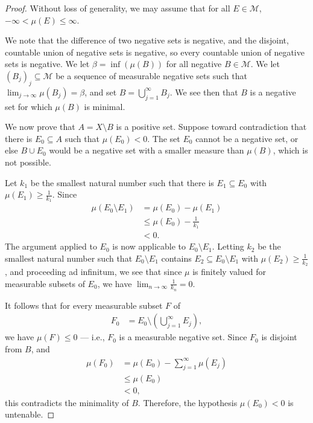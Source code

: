 \documentclass[10pt]{mypackage}
\begin{document}
\begin{proof}
  Without loss of generality, we may assume that for all $E\in \mathcal{M}$, $-\infty < \mu\left( E \right) \leq \infty$.\newline

  We note that the difference of two negative sets is negative, and the disjoint, countable union of negative sets is negative, so every countable union of negative sets is negative. We let $\beta = \inf\left( \mu\left( B \right) \right)$ for all negative $B\in \mathcal{M}$. We let $\left( B_j \right)_j\subseteq \mathcal{M}$ be a sequence of measurable negative sets such that $\lim_{j\rightarrow\infty}\mu\left( B_j \right) = \beta$, and set $B = \bigcup_{j=1}^{\infty}B_j$. We see then that $B$ is a negative set for which $\mu\left( B \right)$ is minimal.\newline

  We now prove that $A = X\setminus B$ is a positive set. Suppose toward contradiction that there is $E_0\subseteq A$ such that $\mu\left( E_0 \right) < 0$. The set $E_0$ cannot be a negative set, or else $B \cup E_0$ would be a negative set with a smaller measure than $\mu\left( B \right)$, which is not possible.\newline

  Let $k_1$ be the smallest natural number such that there is $E_1\subseteq E_0$ with $\mu\left( E_1 \right) \geq \frac{1}{k_1}$. Since
  \begin{align*}
    \mu\left( E_0\setminus E_1 \right) &= \mu\left( E_0 \right) - \mu\left( E_1 \right)\\
                                       &\leq \mu\left( E_0 \right) - \frac{1}{k_1}\\
                                       &< 0.
  \end{align*}
  The argument applied to $E_0$ is now applicable to $E_0\setminus E_1$. Letting $k_2$ be the smallest natural number such that $E_0\setminus E_1$ contains $E_2\subseteq E_0\setminus E_1$ with $\mu\left( E_2 \right) \geq \frac{1}{k_2}$, and proceeding ad infinitum, we see that since $\mu$ is finitely valued for measurable subsets of $E_0$, we have $\lim_{n\rightarrow\infty}\frac{1}{k_n} = 0$.\newline

  It follows that for every measurable subset $F$ of
  \begin{align*}
    F_0 &= E_0\setminus \left( \bigcup_{j=1}^{\infty}E_j \right),
  \end{align*}
  we have $\mu\left( F \right) \leq 0$ --- i.e., $F_0$ is a measurable negative set. Since $F_0$ is disjoint from $B$, and
  \begin{align*}
    \mu\left( F_0 \right) &= \mu\left( E_0 \right) - \sum_{j=1}^{\infty}\mu\left( E_j \right)\\
                          &\leq \mu\left( E_0 \right)\\
                          &< 0,
  \end{align*}
  this contradicts the minimality of $B$. Therefore, the hypothesis $\mu\left( E_0 \right) < 0$ is untenable.\newline


\end{proof}
\end{document}
